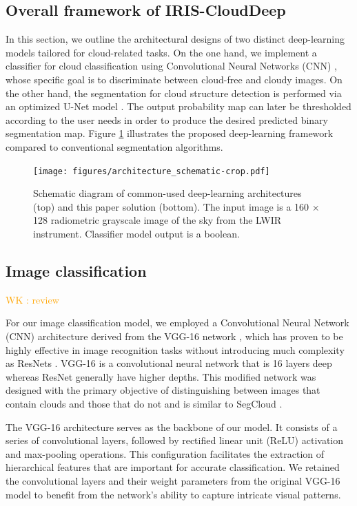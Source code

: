 \documentclass[amt, article]{copernicus}
\begin{document}
\subsection{Overall framework of IRIS-CloudDeep}

In this section, we outline the architectural designs of two distinct deep-learning models tailored for cloud-related tasks. On the one hand, we implement a classifier for cloud classification using Convolutional Neural Networks (CNN) \citep{lecun1995convolutional, Krizhevsky2012}, whose specific goal is to discriminate between cloud-free and cloudy images. On the other hand, the segmentation for cloud structure detection is performed via an optimized U-Net model \citep{UNET}. The output probability map can later be thresholded according to the user needs in order to produce the desired predicted binary segmentation map. Figure \ref{fig:architecture_schematic} illustrates the proposed deep-learning framework compared to conventional segmentation algorithms.

\begin{figure}[t]
	\texttt{[image: figures/architecture\_schematic-crop.pdf]}
	\caption{Schematic diagram of common-used deep-learning architectures (top) and this paper solution (bottom). The input image is a 160 × 128 radiometric grayscale image of the sky from the LWIR instrument. Classifier model output is a boolean.}
    \label{fig:architecture_schematic}
\end{figure}


\subsection{Image classification}

\textcolor{orange}{WK : review}

For our image classification model, we employed a Convolutional Neural Network (CNN) architecture \citep{SHARMA2018377} derived from the VGG-16 network \citep{simonyan2015deep}, which has proven to be highly effective in image recognition tasks \citep{canziani2016analysis} without introducing much complexity as ResNets \citep{ResNet}. VGG-16 is a convolutional neural network that is 16 layers deep whereas ResNet generally have higher depths. This modified network was designed with the primary objective of distinguishing between images that contain clouds and those that do not and is similar to SegCloud \citep{SegCloud}.

The VGG-16 architecture serves as the backbone of our model. It consists of a series of convolutional layers, followed by rectified linear unit (ReLU) activation \citep{agarap2018deep} and max-pooling operations. This configuration facilitates the extraction of hierarchical features that are important for accurate classification. We retained the convolutional layers and their weight parameters from the original VGG-16 model to benefit from the network's ability to capture intricate visual patterns.
\end{document}
